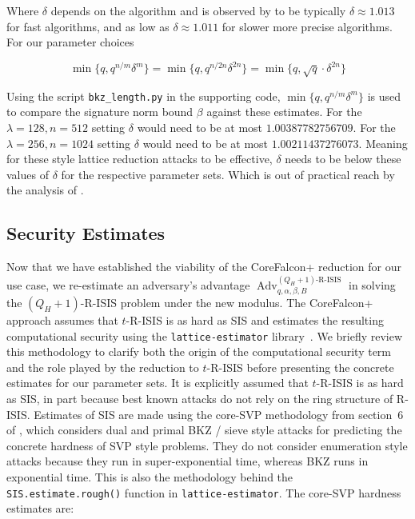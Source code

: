 Where \(\delta\) depends on the algorithm and is observed by
\cite{GamaNguyen2008} to be typically \(\delta \approx 1.013\) for fast
algorithms, and as low as \(\delta \approx 1.011\) for slower more
precise algorithms. For our parameter choices

\[
\min\{q, q^{n/m}\delta^m\} = \min\{q, q^{n/{2n}}\delta^{2n}\} = \min\{q, \sqrt{q} \cdot \delta^{2n}\} 
\]

Using the script \texttt{bkz\_length.py} in the supporting code, \(\min\{q, q^{n/m}\delta^m\}\) 
is used to compare the signature norm bound \(\beta\) against these estimates.
For the \(\lambda=128, n=512\) setting \(\delta\) would need to be at
most \(1.00387782756709\). For the \(\lambda=256, n=1024\) setting
\(\delta\) would need to be at most \(1.00211437276073\). Meaning for
these style lattice reduction attacks to be effective, \(\delta\) needs
to be below these values of \(\delta\) for the respective parameter
sets. Which is out of practical reach by the analysis of \cite{GamaNguyen2008}.



\subsection{Security Estimates}\label{concrete-parameter-choices}

Now that we have established the viability of the CoreFalcon+ reduction for our 
use case, we re-estimate an adversary's advantage
$\operatorname{Adv}^{(Q_H+1)\text{-R-ISIS}}_{q,\alpha,\beta,B}$
in solving the $(Q_H+1)$-R-ISIS problem under the new modulus.
The CoreFalcon+ approach assumes that $t$-R-ISIS is as hard as SIS
and estimates the resulting computational security using the
\texttt{lattice-estimator} library~\cite{LatticeEstimator}.
We briefly review this methodology to clarify both the origin of the
computational security term and the role played by the reduction to
$t$-R-ISIS before presenting the concrete estimates for our parameter
sets.
It is explicitly assumed that $t$-R-ISIS is as hard as SIS, in part because best known attacks do
not rely on the ring structure of R-ISIS. Estimates of SIS are made using the
core-SVP methodology from section~6 of \cite{Albrecht2015LWE},
which considers dual and primal BKZ / sieve style attacks for predicting the
concrete hardness of SVP style problems. They do not consider enumeration style
attacks because they run in super-exponential time, whereas BKZ runs in exponential time.
This is also the methodology behind the \texttt{SIS.estimate.rough()} function in
\texttt{lattice-estimator}. The core-SVP hardness estimates are:

